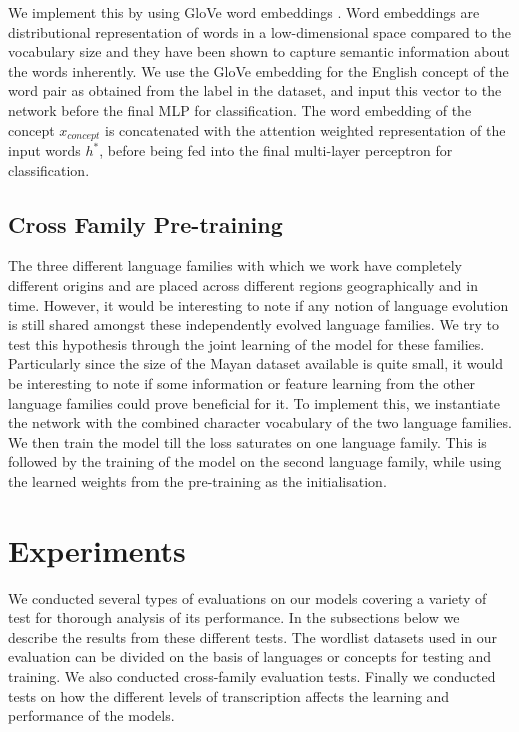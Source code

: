 \documentclass[11pt,letterpaper]{article}
\begin{document}
We implement this by using GloVe word embeddings \citep{pennington2014glove}. Word embeddings are distributional representation of words in a low-dimensional space compared to the vocabulary size and they have been shown to capture semantic information about the words inherently. We use the GloVe embedding for the English concept of the word pair as obtained from the label in the dataset, and input this vector to the network before the final MLP for classification. The word embedding of the concept $x_{concept}$ is concatenated with the attention weighted representation of the input words $h^{*}$, before being fed into the final multi-layer perceptron for classification.

\subsection{Cross Family Pre-training}

The three different language families with which we work have completely different origins and are placed across different regions geographically and in time. However, it would be interesting to note if any notion of language evolution is still shared amongst these independently evolved language families. We try to test this hypothesis through the joint learning of the model for these families. Particularly since the size of the Mayan dataset available is quite small, it would be interesting to note if some information or feature learning from the other language families could prove beneficial for it. To implement this, we instantiate the network with the combined character vocabulary of the two language families. We then train the model till the loss saturates on one language family. This is followed by the training of the model on the second language family, while using the learned weights from the pre-training as the initialisation. 

\section{Experiments}

We conducted several types of evaluations on our models covering a variety of test for thorough analysis of its performance. In the subsections below we describe the results from these different tests.
The wordlist datasets used in our evaluation can be divided on the basis of languages or concepts for testing and training. We also conducted cross-family evaluation tests. Finally we conducted tests on how the different levels of transcription affects the learning and performance of the models.
\end{document}
